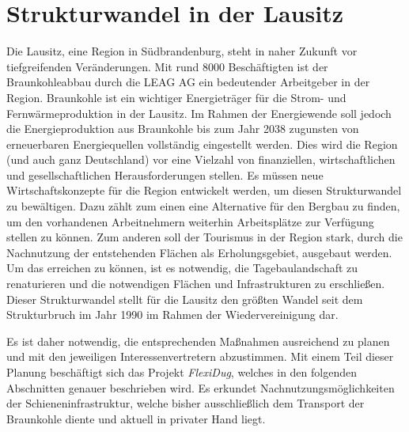 \section{Strukturwandel in der Lausitz}

Die Lausitz, eine Region in Südbrandenburg, steht in naher Zukunft vor tiefgreifenden Veränderungen. Mit rund 8000 Beschäftigten \cite{noauthor_braunkohle_nodate} ist der Braunkohleabbau durch die LEAG AG ein bedeutender Arbeitgeber in der Region. Braunkohle ist ein wichtiger Energieträger für die Strom- und Fernwärmeproduktion in der Lausitz. Im Rahmen der Energiewende soll jedoch die Energieproduktion aus Braunkohle bis zum Jahr 2038 zugunsten von erneuerbaren Energiequellen vollständig eingestellt werden. Dies wird die Region (und auch ganz Deutschland) vor eine Vielzahl von finanziellen, wirtschaftlichen und gesellschaftlichen Herausforderungen stellen. Es müssen neue Wirtschaftskonzepte für die Region entwickelt werden, um diesen Strukturwandel zu bewältigen. Dazu zählt zum einen eine Alternative für den Bergbau zu finden, um den vorhandenen Arbeitnehmern weiterhin Arbeitsplätze zur Verfügung stellen zu können. Zum anderen soll der Tourismus in der Region stark, durch die Nachnutzung der entstehenden Flächen als Erholungsgebiet, ausgebaut werden. Um das erreichen zu können, ist es notwendig, die Tagebaulandschaft zu renaturieren \cite{btu_flexidug_2022} und die notwendigen Flächen und Infrastrukturen zu erschließen. Dieser Strukturwandel stellt für die Lausitz den größten Wandel seit dem Strukturbruch im Jahr 1990 im Rahmen der Wiedervereinigung dar.

Es ist daher notwendig, die entsprechenden Maßnahmen ausreichend zu planen und mit den jeweiligen Interessenvertretern abzustimmen. Mit einem Teil dieser Planung beschäftigt sich das Projekt \emph{FlexiDug}, welches in den folgenden Abschnitten genauer beschrieben wird. Es erkundet Nachnutzungsmöglichkeiten der Schieneninfrastruktur, welche bisher ausschließlich dem Transport der Braunkohle diente und aktuell in privater Hand liegt.